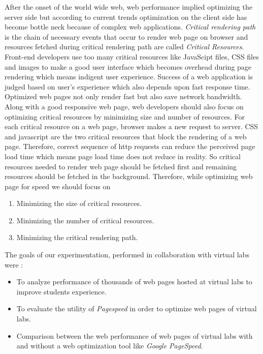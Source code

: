 \documentclass[conference]{IEEEtran}
\begin{document}
After the onset of the world wide web, web performance implied optimizing the
server side but according to current trends
optimization on the client side has become bottle neck because of complex web
applications. 
{\it Critical rendering path} is the chain of necessary events that
occur to render web page on browser and resources fetched during critical rendering path are called 
{\it Critical Resources}\cite{crp}. Front-end developers use too many critical resources like
JavaScipt files, CSS files and images to make a good user interface which becomes
overhead during page rendering which means indigent user experience. Success of a web
application is judged based on user's experience which also depends upon fast response
time. Optimized web pages not only render fast but also save network
bandwidth. Along with a good responsive web page, web developers should
also focus on optimizing critical resources by minimizing size and number of resources.
For each critical resource on a web page, browser makes a new request to server.
CSS and javascript are the two critical resources that block the rendering of a web page.
Therefore, correct sequence of http requests can reduce the perceived page load time which means page
load time does not reduce in reality. So critical resources needed to render web page should be
fetched first and remaining resources should be fetched in the background. Therefore,
while optimizing web page for speed we should focus on \cite{crpo}
\begin{enumerate}
 \item Minimizing the size of critical resources.
 \item Minimizing the number of critical resources.
 \item Minimizing the critical rendering path.
\end{enumerate}

The goals of our experimentation, performed in collaboration with virtual labs were :

\begin{itemize}
\item To analyze performance of thousands of web pages hosted at virtual labs to improve students experience.
\item To evaluate the utility of {\it Pagespeed} in order to optimize web pages of virtual labs.
\item Comparison between the web performance of web pages of virtual labs with
and without a web optimization tool like {\it Google PageSpeed}.
\end{itemize}
\end{document}
